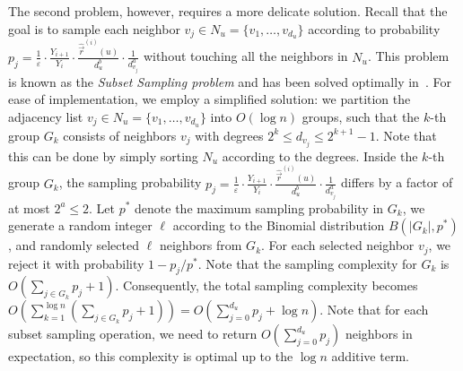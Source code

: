  The second problem, however, requires a more delicate solution. Recall that the goal is to sample each neighbor $v_j \in N_u = \{v_1, \ldots, v_{d_u}\}$ according to probability $p_j = \frac{1}{\varepsilon}\cdot \frac{Y_{i+1}}{Y_i}\cdot \frac{\hat{\vec{r}}^{(i)}(u)}{d_u^b} \cdot \frac{1}{d_{v_j}^a}$ without touching all the neighbors in $N_u$. This problem is known as the {\em Subset Sampling problem} and has been solved optimally in~\cite{bringmann2012efficient}. For ease of implementation, we employ a simplified solution: we partition the adjacency list $v_j \in N_u = \{v_1, \ldots, v_{d_u}\}$ into $O(\log n)$ groups, such that the $k$-th group $G_k$ consists of neighbors $v_j$ with degrees $2^{k} \le d_{v_j} \le 2^{k+1}-1 $. Note that this can be done by simply sorting $N_u$ according to the degrees. Inside the $k$-th group $G_k$, the sampling probability $p_j = \frac{1}{\varepsilon}\cdot \frac{Y_{i+1}}{Y_i}\cdot \frac{\hat{\vec{r}}^{(i)}(u)}{d_u^b} \cdot \frac{1}{d_{v_j}^a}$ differs by a factor of at most $2^a \le 2$. Let $p^*$ denote the maximum sampling probability in $G_k$, we  generate a random integer $\ell$ according to the Binomial distribution $B(|G_k|, p^*)$, and randomly selected $\ell$ neighbors from $G_k$. For each selected neighbor $v_j$, we reject it with probability $1-p_j/p^*$. Note that the sampling complexity for $G_k$ is $O\left(\sum_{j\in G_k} p_j+1\right)$. Consequently, the total sampling complexity becomes $O\left(\sum_{k=1}^{\log n} \left(\sum_{j\in G_k} p_j+1 \right) \right)= O\left(\sum_{j=0}^{d_u} p_j + \log n \right)$. Note that for each subset sampling operation, we need to return $O\left(\sum_{j=0}^{d_u} p_j \right)$ neighbors in expectation, so this complexity is optimal up to the $\log n$ additive term. 









